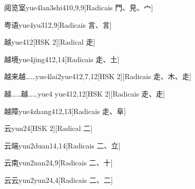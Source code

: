 \begin{entry}{阅览室}{yue4lan3shi4}{10,9,9}[Radicais ⾨、⾒、⼧]
\end{entry}

\begin{entry}{粤语}{yue4yu3}{12,9}[Radicais ⾔、⾔]
\end{entry}

\begin{entry}{越}{yue4}{12}[HSK 2][Radical ⾛]
\end{entry}

\begin{entry}{越境}{yue4jing4}{12,14}[Radicais ⾛、⼟]
\end{entry}

\begin{entry}{越来越……}{yue4lai2yue4}{12,7,12}[HSK 2][Radicais ⾛、⽊、⾛]
\end{entry}

\begin{entry}{越……越……}{yue4 yue4}{12,12}[HSK 2][Radicais ⾛、⾛]
\end{entry}

\begin{entry}{越障}{yue4zhang4}{12,13}[Radicais ⾛、⾩]
\end{entry}

\begin{entry}{云}{yun2}{4}[HSK 2][Radical ⼆]
\end{entry}

\begin{entry}{云端}{yun2duan1}{4,14}[Radicais ⼆、⽴]
\end{entry}

\begin{entry}{云南}{yun2nan2}{4,9}[Radicais ⼆、⼗]
\end{entry}

\begin{entry}{云云}{yun2yun2}{4,4}[Radicais ⼆、⼆]
\end{entry}

